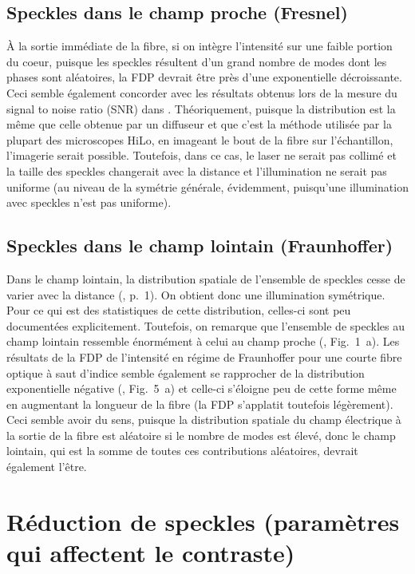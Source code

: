 \documentclass{article}       %
\begin{document}
\subsection{Speckles dans le champ proche (Fresnel)}

À la sortie immédiate de la fibre, si on intègre l'intensité sur une faible portion du coeur, puisque les speckles résultent d'un grand nombre de modes dont les phases sont aléatoires, la FDP devrait être près d'une exponentielle décroissante. Ceci semble également concorder avec les résultats obtenus lors de la mesure du signal to noise ratio (SNR) dans \cite{Constrained}. Théoriquement, puisque la distribution est la même que celle obtenue par un diffuseur et que c'est la méthode utilisée par la plupart des microscopes HiLo, en imageant le bout de la fibre sur l'échantillon, l'imagerie serait possible. Toutefois, dans ce cas, le laser ne serait pas collimé et la taille des speckles changerait avec la distance et l'illumination ne serait pas uniforme (au niveau de la symétrie générale, évidemment, puisqu'une illumination avec speckles n'est pas uniforme).


\subsection{Speckles dans le champ lointain (Fraunhoffer)}

Dans le champ lointain, la distribution spatiale de l'ensemble de speckles cesse de varier avec la distance (\cite{Commerce}, p.~1). On obtient donc une illumination symétrique. Pour ce qui est des statistiques de cette distribution, celles-ci sont peu documentées explicitement. Toutefois, on remarque que l'ensemble de speckles au champ lointain ressemble énormément à celui au champ proche (\cite{FiberStats}, Fig.~1~a). Les résultats de la FDP de l'intensité en régime de Fraunhoffer pour une courte fibre optique à saut d'indice semble également se rapprocher de la distribution exponentielle négative (\cite{FiberStats}, Fig.~5~a) et celle-ci s'éloigne peu de cette forme même en augmentant la longueur de la fibre (la FDP s'applatit toutefois légèrement). Ceci semble avoir du sens, puisque la distribution spatiale du champ électrique à la sortie de la fibre est aléatoire si le nombre de modes est élevé, donc le champ lointain, qui est la somme de toutes ces contributions aléatoires, devrait également l'être.\\

\bigskip

\section{Réduction de speckles (paramètres qui affectent le contraste)}
\label{Sec:Reduction}
\end{document}
